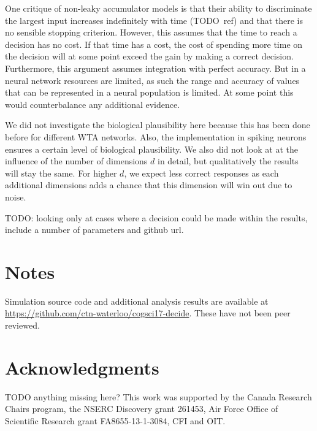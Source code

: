 \documentclass[10pt,letterpaper]{article}
\begin{document}
One critique of non-leaky accumulator models is that their ability to 
discriminate the largest input increases indefinitely with time (TODO~ref) and 
that there is no sensible stopping criterion. However, this assumes that the 
time to reach a decision has no cost. If that time has a cost, the cost of 
spending more time on the decision will at some point exceed the gain by making 
a correct decision. Furthermore, this argument assumes integration with perfect 
accuracy. But in a neural network resources are limited, as such the range and 
accuracy of values that can be represented in a neural population is limited.  
At some point this would counterbalance any additional evidence.

We did not investigate the biological plausibility here because this has been 
done before for different WTA networks.  Also, the implementation in spiking 
neurons ensures a certain level of biological plausibility. We also did not look 
at at the influence of the number of dimensions $d$ in detail, but qualitatively 
the results will stay the same. For higher $d$, we expect less correct responses 
as each additional dimensions adds a chance that this dimension will win out due 
to noise.

TODO\@: looking only at cases where a decision could be made within the results, 
include a number of parameters and github url.

\section{Notes}
Simulation source code and additional analysis results are available at 
\url{https://github.com/ctn-waterloo/cogsci17-decide}.  These have not been peer 
reviewed.

\section{Acknowledgments}
TODO anything missing here?
This work was supported by the Canada Research Chairs program,
the NSERC Discovery grant 261453, Air Force Office of Scientific Research grant 
FA8655-13-1-3084, CFI and OIT\@.  %




\setlength{\bibleftmargin}{.125in}
\setlength{\bibindent}{-\bibleftmargin}


\end{document}
